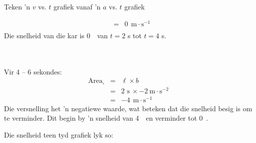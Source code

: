 \begin{wex}{Teken  'n $v$ vs. $t$ grafiek vanaf  'n $a$ vs. $t$ grafiek}
{\begin{minipage}{0.3\textwidth}
\begin{eqnarray*}
&=&0\ ~\text{m}\cdot \text{s}^{-1}\\
\end{eqnarray*}
Die snelheid van die kar is 0~\ms ~van $t=2$ s tot $t=4$ s.\\
\\
\\
\end{minipage}
\begin{minipage}{0.03\textwidth}
\begin{center}
\end{center}
\end{minipage}
\begin{minipage}{0.3\textwidth}
Vir 4 -- 6 sekondes:
\begin{eqnarray*}
\text{Area}_{\square} &=& \ell \times b\\
&=& 2\text{~s}\ \times -2~\text{m}\cdot \text{s}^{-2}\ \\
&=&-4\ ~\text{m}\cdot \text{s}^{-1}
\end{eqnarray*}
Die versnelling het  'n negatiewe waarde, wat beteken dat die snelheid besig is om te verminder. Dit begin by  'n snelheid van 4~\ms ~en verminder tot 0~\ms.\\
\end{minipage}

\begin{minipage}{0.3\textwidth}
Die snelheid teen tyd grafiek lyk so:
\end{minipage}
\begin{minipage}{0.7\textwidth}
\begin{center}
\end{center}
\end{minipage}
}
\end{wex}

